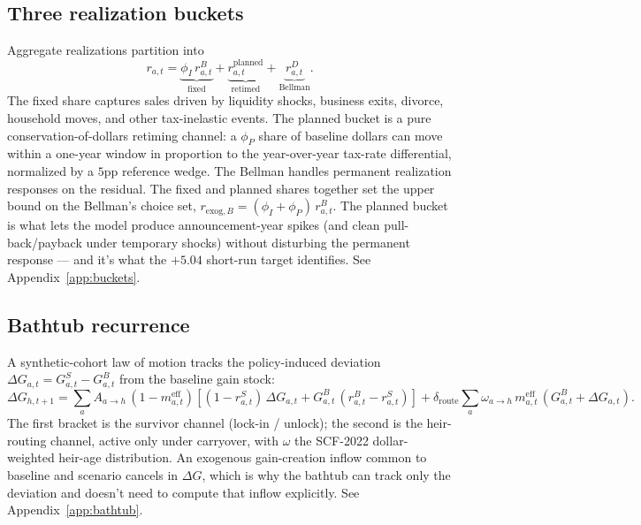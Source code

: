 \documentclass[11pt]{article}
\begin{document}
\subsection{Three realization buckets}
\label{sec:buckets}

Aggregate realizations partition into
\begin{equation}
r_{a,t} = \underbrace{\phi_I\,r^B_{a,t}}_{\text{fixed}}
        + \underbrace{r^{\text{planned}}_{a,t}}_{\text{retimed}}
        + \underbrace{r^D_{a,t}}_{\text{Bellman}}.
\label{eq:buckets}
\end{equation}
The fixed share captures sales driven by liquidity shocks, business exits,
divorce, household moves, and other tax-inelastic events. The planned
bucket is a pure conservation-of-dollars retiming channel: a $\phi_P$
share of baseline dollars can move within a one-year window in proportion
to the year-over-year tax-rate differential, normalized by a $5$pp
reference wedge. The Bellman handles permanent realization responses on
the residual. The fixed and planned shares together set the upper bound
on the Bellman's choice set,
$r_{\text{exog},B} = (\phi_I + \phi_P)\,r^B_{a,t}$. The planned bucket is
what lets the model produce announcement-year spikes (and clean
pull-back/payback under temporary shocks) without disturbing the permanent
response --- and it's what the $+5.04$ short-run target identifies. See
Appendix~\ref{app:buckets}.

\subsection{Bathtub recurrence}

A synthetic-cohort law of motion tracks the policy-induced deviation
$\Delta G_{a,t} = G^S_{a,t} - G^B_{a,t}$ from the baseline gain stock:
\begin{equation}
\Delta G_{h, t+1}
  = \sum_a A_{a \to h}\,(1 - m^{\text{eff}}_{a,t})\!
    \left[(1 - r^S_{a,t})\,\Delta G_{a,t}
          + G^B_{a,t}\,(r^B_{a,t} - r^S_{a,t})\right]
  + \delta_{\text{route}}\!
    \sum_a \omega_{a \to h}\,m^{\text{eff}}_{a,t}\,(G^B_{a,t} + \Delta G_{a,t}).
\label{eq:bathtub}
\end{equation}
The first bracket is the survivor channel (lock-in / unlock); the second
is the heir-routing channel, active only under carryover, with $\omega$
the SCF-2022 dollar-weighted heir-age distribution. An exogenous
gain-creation inflow common to baseline and scenario cancels in
$\Delta G$, which is why the bathtub can track only the deviation and
doesn't need to compute that inflow explicitly. See
Appendix~\ref{app:bathtub}.
\end{document}
